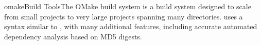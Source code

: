 %
%
\begin{Name}{1}{omake}{\authors}{Build Tools}{The OMake build system}
   is a build system designed to scale from small projects to very large projects
  spanning many directories.   uses a syntax similar to , with many
  additional features, including accurate automated dependency analysis based on MD5 digests.
\end{Name}

